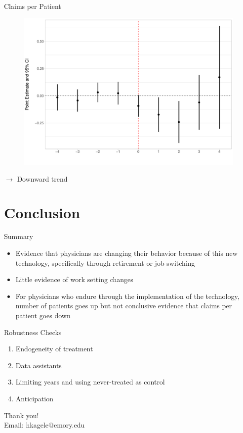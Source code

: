 \documentclass[10pt]{beamer}
\begin{document}
\begin{frame}{Claims per Patient}
\begin{figure}[ht]
\centering
\includegraphics[scale=.35]{Objects/Presentation_claimperpatient_all.pdf}
\end{figure}
$\rightarrow$ Downward trend
\end{frame}



\section{Conclusion}


\begin{frame}{Summary}
\begin{itemize}
    \item Evidence that physicians are changing their behavior because of this new technology, specifically through retirement or job switching
                \vspace{3mm}
    \item Little evidence of work setting changes
                \vspace{3mm}
    \item For physicians who endure through the implementation of the technology, number of patients goes up but not conclusive evidence that claims per patient goes down
\end{itemize}
\end{frame}

\begin{frame}{Robustness Checks}
\begin{enumerate}
    \item Endogeneity of treatment
            \vspace{3mm}
    \item Data assistants
            \vspace{3mm}
    \item Limiting years and using never-treated as control
            \vspace{3mm}
    \item Anticipation
\end{enumerate}
\end{frame}


\begin{frame}[plain]{}
\centering
    Thank you! \\
    \vspace{5mm}
    Email: hkagele@emory.edu
\end{frame}
\end{document}

